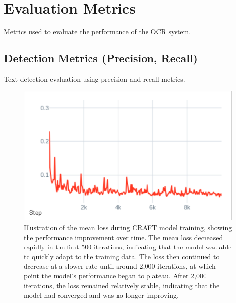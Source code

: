 \section{Evaluation Metrics}
\label{sec:metrics}
Metrics used to evaluate the performance of the OCR system.

\subsection{Detection Metrics (Precision, Recall)}
\label{subsec:detection-metrics}
Text detection evaluation using precision and recall metrics.

\begin{figure}[H]
    \centering
    \includegraphics[width=\textwidth]{figures/mean_loss_craft.png}
    \caption{Illustration of the mean loss during CRAFT model training, showing the performance 
    improvement over time. The mean loss decreased rapidly in the first 500 iterations, 
    indicating that the model was able to quickly adapt to the training data. The loss then 
    continued to decrease at a slower rate until around 2,000 iterations, at which point 
    the model's performance began to plateau. After 2,000 iterations, the loss remained 
    relatively stable, indicating that the model had converged and was no longer improving.}
    \label{fig:mean-loss-craft}
\end{figure}

